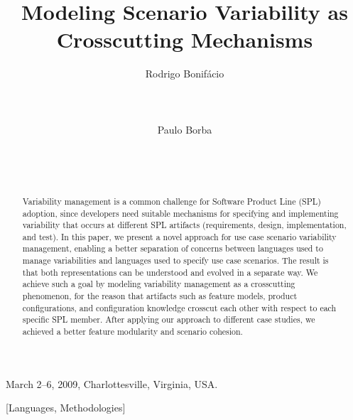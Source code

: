 \documentclass{sig-alt-full}
\begin{document}
 {March 2--6, 2009, Charlottesville, Virginia, USA.} 

\lstset{language=Haskell, numbers=left,
numberstyle=\tiny,numbersep=5pt,basicstyle=\scriptsize,aboveskip=20pt}

\title{Modeling Scenario Variability as Crosscutting Mechanisms}



\author{
\alignauthor
Rodrigo Bonif\'{a}cio\\
       \\
       \\
       \\
\alignauthor
Paulo Borba\\
       \\
       \\
       \\
}

\maketitle

\begin{abstract}
Variability management is a common challenge for Software Product
Line (SPL) adoption, since developers need suitable
mechanisms for specifying and implementing variability
that occurs at different SPL artifacts (requirements, design,
implementation, and test). In this paper, we present a novel approach for
use case scenario variability management, enabling a better
separation of concerns between languages used to manage
variabilities and languages used to specify use case scenarios. The
result is that both representations can be understood and evolved in
a separate way. We achieve such a goal by modeling variability management
as a crosscutting phenomenon, for the reason that artifacts such as feature models,
product configurations, and configuration knowledge crosscut each
other with respect to each specific SPL member. After applying our approach to
different case studies, we achieved a better feature modularity and scenario cohesion.
\end{abstract}

[Languages,
Methodologies]\
\end{document}
